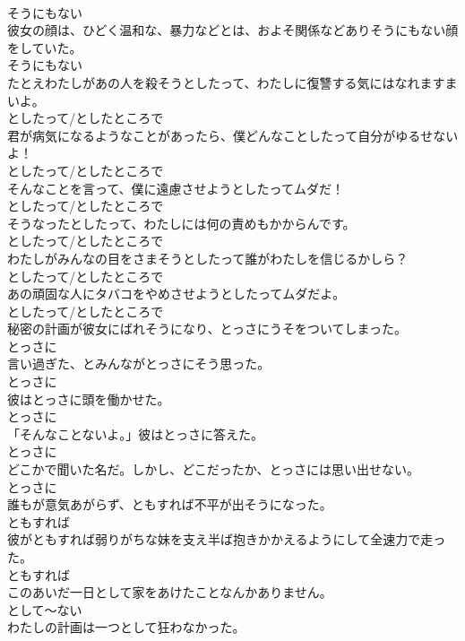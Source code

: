 \documentclass[8pt]{extreport}
\begin{document}
\begin{CJK}{UTF8}{min}
\\	そうにもない	
\\	彼女の顔は、ひどく温和な、暴力などとは、およそ関係などありそうにもない顔をしていた。	
\\	そうにもない	
\\	たとえわたしがあの人を殺そうとしたって、わたしに復讐する気にはなれますまいよ。	
\\	としたって/としたところで	
\\	君が病気になるようなことがあったら、僕どんなことしたって自分がゆるせないよ！	
\\	としたって/としたところで	
\\	そんなことを言って、僕に遠慮させようとしたってムダだ！	
\\	としたって/としたところで	
\\	そうなったとしたって、わたしには何の責めもかからんです。	
\\	としたって/としたところで	
\\	わたしがみんなの目をさまそうとしたって誰がわたしを信じるかしら？	
\\	としたって/としたところで	
\\	あの頑固な人にタバコをやめさせようとしたってムダだよ。	
\\	としたって/としたところで	
\\	秘密の計画が彼女にばれそうになり、とっさにうそをついてしまった。	
\\	とっさに	
\\	言い過ぎた、とみんながとっさにそう思った。	
\\	とっさに	
\\	彼はとっさに頭を働かせた。	
\\	とっさに	
\\	「そんなことないよ。」彼はとっさに答えた。	
\\	とっさに	
\\	どこかで聞いた名だ。しかし、どこだったか、とっさには思い出せない。	
\\	とっさに	
\\	誰もが意気あがらず、ともすれば不平が出そうになった。	
\\	ともすれば	
\\	彼がともすれば弱りがちな妹を支え半ば抱きかかえるようにして全速力で走った。	
\\	ともすれば	
\\	このあいだ一日として家をあけたことなんかありません。	
\\	として～ない	
\\	わたしの計画は一つとして狂わなかった。	

\end{CJK}
\end{document}
